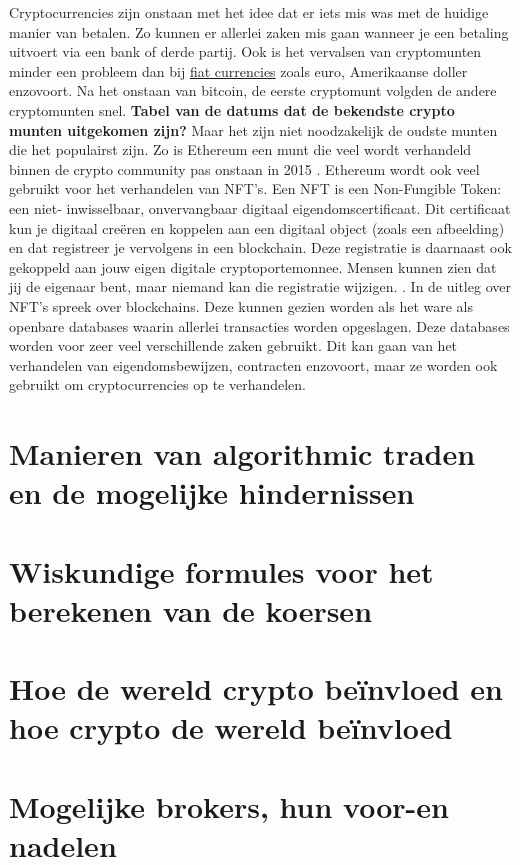 Cryptocurrencies zijn onstaan met het idee dat er iets mis was met de huidige manier van betalen. Zo kunnen er allerlei zaken mis gaan wanneer je een betaling uitvoert via een bank of derde partij. Ook is het vervalsen van cryptomunten minder een probleem dan bij \underline{fiat currencies} zoals euro, Amerikaanse doller enzovoort. Na het onstaan van bitcoin, de eerste cryptomunt volgden de andere cryptomunten snel. \textbf{Tabel van de datums dat de bekendste crypto munten uitgekomen zijn?} Maar het zijn niet noodzakelijk de oudste munten die het populairst zijn. Zo is Ethereum een munt die veel wordt verhandeld binnen de crypto community pas onstaan in 2015 \autocite{}. Ethereum wordt ook veel gebruikt voor het verhandelen van NFT's. Een NFT is een Non-Fungible Token: een niet- inwisselbaar, onvervangbaar digitaal eigendomscertificaat. Dit certificaat kun je digitaal creëren en koppelen aan een digitaal object (zoals een afbeelding) en dat registreer je vervolgens in een blockchain. Deze registratie is daarnaast ook gekoppeld aan jouw eigen digitale cryptoportemonnee. Mensen kunnen zien dat jij de eigenaar bent, maar niemand kan die registratie wijzigen. \autocite{Duursma2021}. In de uitleg over NFT's spreek \textcite{Duursma2021} over blockchains. Deze kunnen gezien worden als het ware als openbare databases waarin allerlei transacties worden opgeslagen. Deze databases worden voor zeer veel verschillende zaken gebruikt. Dit kan gaan van het verhandelen van eigendomsbewijzen, contracten enzovoort, maar ze worden ook gebruikt om cryptocurrencies op te verhandelen.

\section{Manieren van algorithmic traden en de mogelijke hindernissen}



\section{Wiskundige formules voor het berekenen van de koersen}



\section{Hoe de wereld crypto beïnvloed en hoe crypto de wereld beïnvloed}



\section{Mogelijke brokers, hun voor-en nadelen}